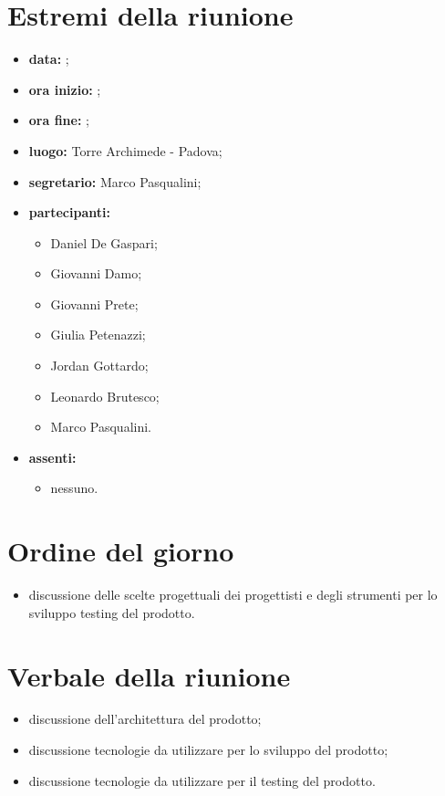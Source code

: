 \documentclass[a4paper,11pt]{article}
\begin{document}
	\section{Estremi della riunione}
	\begin{itemize}
		\item \textbf{data:} ;
		\item \textbf{ora inizio:} ;
		\item \textbf{ora fine:} ;
		\item \textbf{luogo:} Torre Archimede - Padova;
		\item \textbf{segretario:} Marco Pasqualini;
		\item \textbf{partecipanti:}
			\begin{itemize}
				\item Daniel De Gaspari;
				\item Giovanni Damo;
				\item Giovanni Prete;
				\item Giulia Petenazzi;
				\item Jordan Gottardo;
				\item Leonardo Brutesco;
				\item Marco Pasqualini.
			\end{itemize}
		\item \textbf{assenti:}
			\begin{itemize}
			 \item nessuno.
			\end{itemize}
	\end{itemize}
	\section{Ordine del giorno}
		\begin{itemize}
			\item discussione delle scelte progettuali dei progettisti e degli strumenti per lo sviluppo testing del prodotto.
		\end{itemize}
	\section{Verbale della riunione}
		\begin{itemize}
		\item discussione dell'architettura del prodotto;
		\item discussione tecnologie da utilizzare per lo sviluppo del prodotto;
		\item discussione tecnologie da utilizzare per il testing del prodotto.
		\end{itemize}
\end{document}
